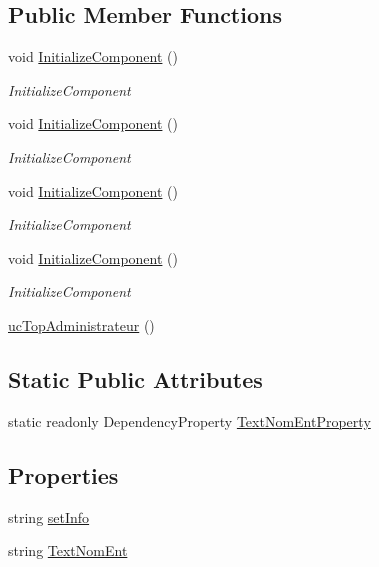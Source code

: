 \subsection*{Public Member Functions}
\begin{DoxyCompactItemize}
\item 
void \hyperlink{classnewPizza1_1_1ucTopAdministrateur_a79b4fb5df50a0755f8616ccd6d462953}{Initialize\+Component} ()
\begin{DoxyCompactList}\small\item\em Initialize\+Component \end{DoxyCompactList}\item 
void \hyperlink{classnewPizza1_1_1ucTopAdministrateur_a79b4fb5df50a0755f8616ccd6d462953}{Initialize\+Component} ()
\begin{DoxyCompactList}\small\item\em Initialize\+Component \end{DoxyCompactList}\item 
void \hyperlink{classnewPizza1_1_1ucTopAdministrateur_a79b4fb5df50a0755f8616ccd6d462953}{Initialize\+Component} ()
\begin{DoxyCompactList}\small\item\em Initialize\+Component \end{DoxyCompactList}\item 
void \hyperlink{classnewPizza1_1_1ucTopAdministrateur_a79b4fb5df50a0755f8616ccd6d462953}{Initialize\+Component} ()
\begin{DoxyCompactList}\small\item\em Initialize\+Component \end{DoxyCompactList}\item 
\hyperlink{classnewPizza1_1_1ucTopAdministrateur_a97ad9e9f26e5df784d8aa4e92619d8af}{uc\+Top\+Administrateur} ()
\end{DoxyCompactItemize}
\subsection*{Static Public Attributes}
\begin{DoxyCompactItemize}
\item 
static readonly Dependency\+Property \hyperlink{classnewPizza1_1_1ucTopAdministrateur_a99d1f6f7dc1cba0a32d21ae318743bfd}{Text\+Nom\+Ent\+Property}
\end{DoxyCompactItemize}
\subsection*{Properties}
\begin{DoxyCompactItemize}
\item 
string \hyperlink{classnewPizza1_1_1ucTopAdministrateur_ac0ce93514c9cc7e562df72033c6a0bb4}{set\+Info}
\item 
string \hyperlink{classnewPizza1_1_1ucTopAdministrateur_a37289b547deb5667fe983399693d4bdb}{Text\+Nom\+Ent}
\end{DoxyCompactItemize}


